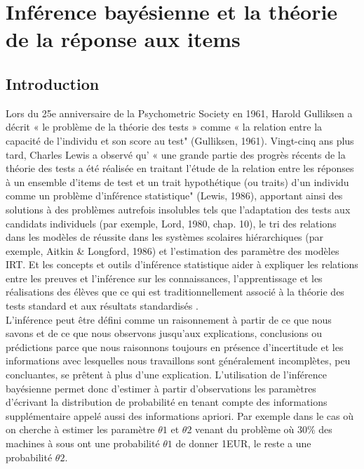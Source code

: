 \chapter{Inférence bayésienne et la théorie de la réponse aux items}
\label{chap:irt}
\minitoc
\thispagestyle{empty}
\newpage

\section{Introduction}
Lors du 25e anniversaire de la Psychometric Society en 1961, Harold Gulliksen a décrit « le problème de la théorie des tests » comme « la relation entre la capacité de l'individu et son score au test" (Gulliksen, 1961). Vingt-cinq ans plus tard, Charles Lewis a observé qu' « une grande partie des progrès récents de la théorie des tests a été réalisée en traitant l'étude de la relation entre les réponses à un ensemble d'items de test et un trait hypothétique (ou traits) d'un individu comme un problème d'inférence statistique" (Lewis, 1986), apportant ainsi des solutions à des problèmes autrefois insolubles tels que l'adaptation des tests aux candidats individuels (par exemple, Lord, 1980, chap. 10), le tri des relations dans les modèles de réussite dans les systèmes scolaires hiérarchiques (par exemple, Aitkin \& Longford, 1986) et l’estimation des paramètre des modèles IRT. Et les concepts et outils d'inférence statistique aider à expliquer les relations entre les preuves et l'inférence sur les connaissances, l'apprentissage et les réalisations des élèves que ce qui est traditionnellement associé à la théorie des tests standard et aux résultats standardisés \cite{mislevy1994evidence}. \\
L'inférence peut être défini comme un raisonnement à partir de ce que nous savons et de ce que nous observons jusqu'aux explications, conclusions ou prédictions parce que nous raisonnons toujours en présence d'incertitude et les informations avec lesquelles nous travaillons sont généralement incomplètes, peu concluantes, se prêtent à plus d’une explication. L’utilisation de l’inférence bayésienne permet donc d’estimer à partir d’observations les paramètres d’écrivant la distribution de probabilité en tenant compte des informations supplémentaire appelé aussi des informations apriori. Par exemple dans le cas où on cherche à estimer les paramètre \(\displaystyle \theta1 \) et \(\displaystyle \theta2 \) venant du problème où 30\% des machines à sous ont une probabilité \(\displaystyle \theta1 \)  de donner 1EUR, le reste a une probabilité \(\displaystyle \theta2 \).\\
